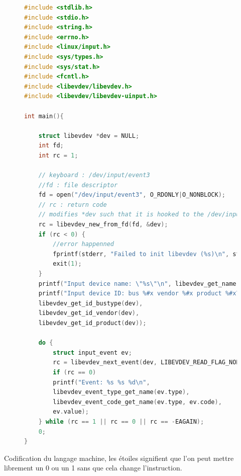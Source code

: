 \documentclass[10pt,a4paper,notitlepage ]{article}
\begin{document}
	\begin{figure}
	\begin{lstlisting}[language=C, frame=single, caption={Keylogger test}]
#include <stdlib.h>
#include <stdio.h>
#include <string.h>
#include <errno.h>
#include <linux/input.h>
#include <sys/types.h>
#include <sys/stat.h>
#include <fcntl.h>
#include <libevdev/libevdev.h>
#include <libevdev/libevdev-uinput.h>

int main(){
	
	struct libevdev *dev = NULL;
	int fd;
	int rc = 1;
	
	// keyboard : /dev/input/event3
	//fd : file descriptor
	fd = open("/dev/input/event3", O_RDONLY|O_NONBLOCK);
	// rc : return code
	// modifies *dev such that it is hooked to the /dev/input file
	rc = libevdev_new_from_fd(fd, &dev);
	if (rc < 0) {
		//error happenned
		fprintf(stderr, "Failed to init libevdev (%s)\n", strerror(-rc));
		exit(1);
	}
	printf("Input device name: \"%s\"\n", libevdev_get_name(dev));
	printf("Input device ID: bus %#x vendor %#x product %#x\n",
	libevdev_get_id_bustype(dev),
	libevdev_get_id_vendor(dev),
	libevdev_get_id_product(dev));
	
	do {
		struct input_event ev;
		rc = libevdev_next_event(dev, LIBEVDEV_READ_FLAG_NORMAL, &ev);
		if (rc == 0)
		printf("Event: %s %s %d\n",
		libevdev_event_type_get_name(ev.type),
		libevdev_event_code_get_name(ev.type, ev.code),
		ev.value);
	} while (rc == 1 || rc == 0 || rc == -EAGAIN);
	0;
}
	\end{lstlisting}
	\end{figure}


\newpage

Codification du langage machine, les étoiles signifient que l'on peut mettre librement un 0 ou un 1 sans que cela change l'instruction.
\end{document}
